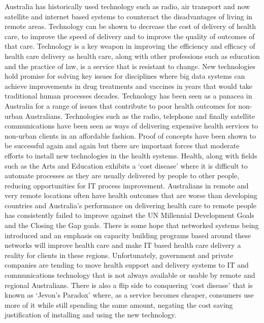 Australia has historically used technology such as radio, air transport and now satellite and internet based systems to counteract the disadvantages of living in remote areas. Technology can be shown to decrease the cost of delivery of health care, to improve the speed of delivery and to improve the quality of outcomes of that care. Technology is a key weapon in improving the efficiency and efficacy of health care delivery as health care, along with other professions such as education and the practice of law, is a service that is resistant to change. New technologies hold promise for solving key issues for disciplines where big data systems can achieve improvements in drug treatments and vaccines in years that would take traditional human processes decades. Technology has been seen as a panacea in Australia for a range of issues that contribute to poor health outcomes for non-urban Australians. Technologies such as the radio, telephone and finally satellite communications have been seen as ways of delivering expensive health services to non-urban clients in an affordable fashion. Proof of concepts have been shown to be successful again and again but there are important forces that moderate efforts to install new technologies in the health systems. Health, along with fields such as the Arts and Education exhibits a `cost disease' where it is difficult to automate processes as they are usually delivered by people to other people, reducing opportunities for IT process improvement. 
Australians in remote and very remote locations often have health outcomes that are worse than developing countries and Australia's performance on delivering health care to remote people has consistently failed to improve against the UN Millennial Development Goals and the Closing the Gap goals. There is some hope that networked systems being introduced and an emphasis on capacity building programs based around these networks will improve health care and make IT based health care delivery a reality for clients in these regions. Unfortunately, government and private companies are tending to move health support and delivery systems to IT and communications technology that is not always available or usable by remote and regional Australians. There is also a flip side to conquering `cost disease' that is known as `Jevon's Paradox' where, as a service becomes cheaper, consumers use more of it while still spending the same amount, negating the cost saving justification of installing and using the new technology. 


